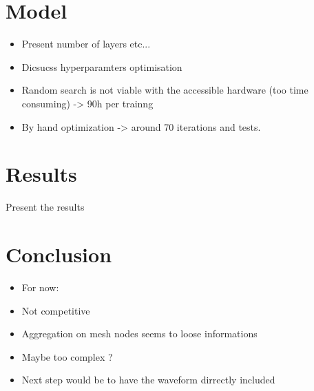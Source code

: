 \documentclass[../main.tex]{subfiles}
\begin{document}
\section{Model}
\begin{itemize}
  \item Present number of layers etc...
  \item Dicsucss hyperparamters optimisation
  \item Random search is not viable with the accessible hardware (too time consuming) -> 90h per trainng
  \item By hand optimization -> around 70 iterations and tests.
\end{itemize}

\section{Results}
\label{sec:jgnn:results}
Present the results

\section{Conclusion}
\begin{itemize}
  \item For now:
  \item Not competitive
  \item Aggregation on mesh nodes seems to loose informations
  \item Maybe too complex ?
  \item Next step would be to have the waveform dirrectly included
\end{itemize}
\end{document}
